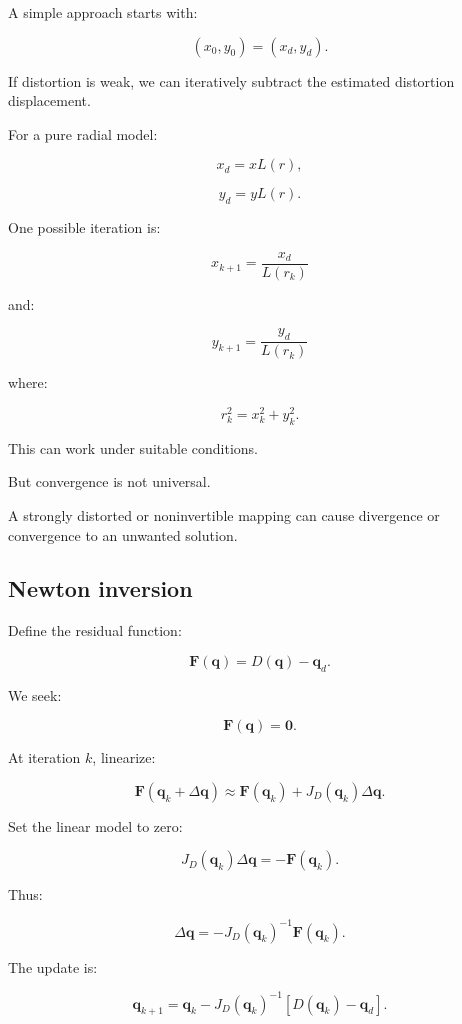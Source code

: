 \hypertarget{02-foundations-ii-ch035-fixed-point-inversion}{}

A simple approach starts with:

\[
 \boxed{ (x_0,y_0)=(x_d,y_d) }.
\]

If distortion is weak, we can iteratively subtract the estimated distortion displacement.

For a pure radial model:

\[
 x_d=xL(r),
\]

\[
 y_d=yL(r).
\]

One possible iteration is:

\[
 \boxed{ x_{k+1}=\frac{x_d}{L(r_k)} }
\]

and:

\[
 \boxed{ y_{k+1}=\frac{y_d}{L(r_k)} }
\]

where:

\[
 r_k^2=x_k^2+y_k^2.
\]

This can work under suitable conditions.

But convergence is not universal.

A strongly distorted or noninvertible mapping can cause divergence or convergence to an unwanted solution.

\subsection{Newton inversion}\label{02-foundations-ii-ch035-newton-inversion}

\hypertarget{02-foundations-ii-ch035-newton-inversion}{}

Define the residual function:

\[
 \boxed{ \mathbf F(\mathbf q)= D(\mathbf q)-\mathbf q_d }.
\]

We seek:

\[
 \mathbf F(\mathbf q)=\mathbf0.
\]

At iteration \(k\), linearize:

\[
 \mathbf F(\mathbf q_k+\Delta\mathbf q) \approx \mathbf F(\mathbf q_k)+J_D(\mathbf q_k)\Delta\mathbf q.
\]

Set the linear model to zero:

\[
 J_D(\mathbf q_k)\Delta\mathbf q = -\mathbf F(\mathbf q_k).
\]

Thus:

\[
 \boxed{ \Delta\mathbf q = -J_D(\mathbf q_k)^{-1} \mathbf F(\mathbf q_k) }.
\]

The update is:

\[
 \boxed{ \mathbf q_{k+1} = \mathbf q_k- J_D(\mathbf q_k)^{-1} [D(\mathbf q_k)-\mathbf q_d] }.
\]

